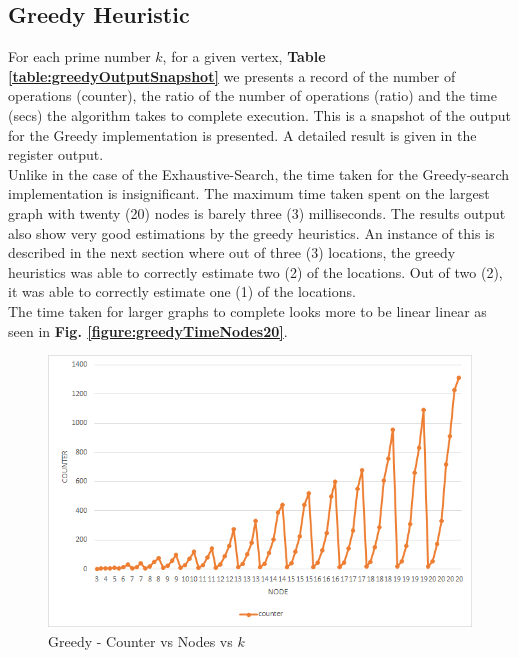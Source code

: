 \documentclass[longpaper, english, final, times]{revdetua}
\begin{document}
		\newpage
		\subsection{Greedy Heuristic}
			For each prime number $k$, for a given vertex, \textbf{Table \ref{table:greedyOutputSnapshot}} we presents a record of the number of operations (counter), the ratio of the number of operations (ratio) and the time (secs) the algorithm takes to complete execution. This is a snapshot of the output for the Greedy implementation is presented. A detailed result is given in the register output. \\
			
			Unlike in the case of the Exhaustive-Search, the time taken for the Greedy-search implementation is insignificant. The maximum time taken spent on the largest graph with twenty (20) nodes is barely three (3) milliseconds. The results output also show very good estimations by the greedy heuristics. An instance of this is described in the next section where out of three (3) locations, the greedy heuristics was able to correctly estimate two (2) of the locations. Out of two (2), it was able to correctly estimate one (1) of the locations.\\
			
			The time taken for larger graphs to complete looks more to be linear linear as seen in \textbf{Fig. \ref{figure:greedyTimeNodes20}}.
			
			\begin{figure}[!h]
				\includegraphics[width=1\linewidth]{imgs/greedyCounterNodes20.png}
				\caption{Greedy - Counter vs Nodes vs $k$}
				\label{figure:greedyCounterNodes20}
			\end{figure}
		
\end{document}
